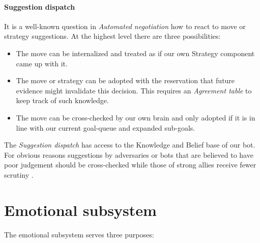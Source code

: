 \documentclass[pdftex,11pt,a4paper]{report}
\begin{document}
\paragraph{Suggestion dispatch}
It is a well-known question in \textit{Automated negotiation} how 
to react to move or strategy suggestions. At the highest level there
are three possibilities:

\begin{itemize}

\item The move can be internalized and treated as if our own 
      Strategy component came up with it. 

\item The move or strategy can be adopted with the reservation 
      that future evidence might invalidate this decision. This 
      requires an \textit{Agreement table} to keep track of such
      knowledge.

\item The move can be cross-checked by our own brain and only 
      adopted if it is in line with our current goal-queue and 
      expanded sub-goals. 

\end{itemize}

The \textit{Suggestion dispatch} has access to the Knowledge and
Belief base of our bot. For obvious reasons suggestions by
adversaries or bots that are believed to have poor judgement 
should be cross-checked while those of strong allies receive fewer
scrutiny . \\

\section{Emotional subsystem}

The emotional subsystem serves three purposes:
\end{document}
